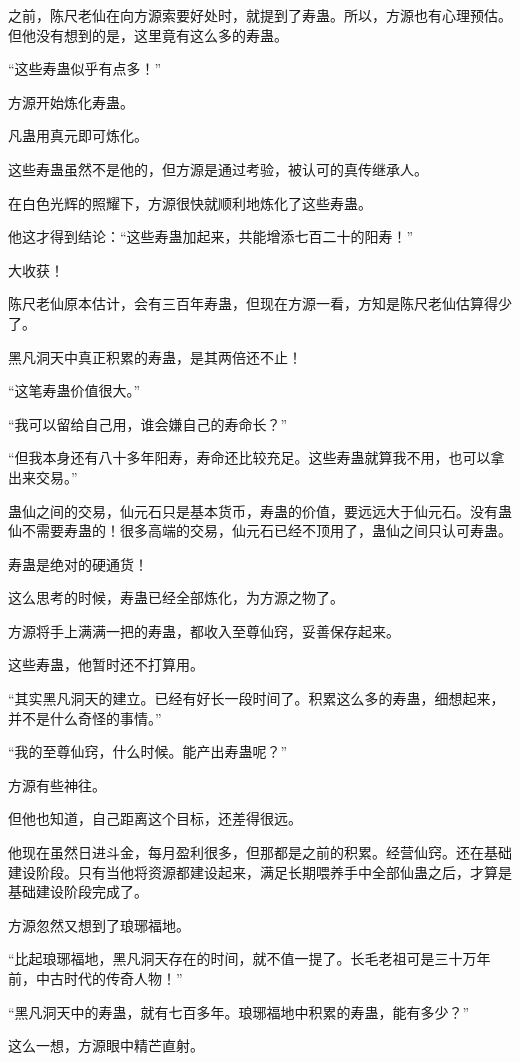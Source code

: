 \begin{this_body}
之前，陈尺老仙在向方源索要好处时，就提到了寿蛊。所以，方源也有心理预估。但他没有想到的是，这里竟有这么多的寿蛊。

“这些寿蛊似乎有点多！”

方源开始炼化寿蛊。

凡蛊用真元即可炼化。

这些寿蛊虽然不是他的，但方源是通过考验，被认可的真传继承人。

在白色光辉的照耀下，方源很快就顺利地炼化了这些寿蛊。

他这才得到结论：“这些寿蛊加起来，共能增添七百二十的阳寿！”

大收获！

陈尺老仙原本估计，会有三百年寿蛊，但现在方源一看，方知是陈尺老仙估算得少了。

黑凡洞天中真正积累的寿蛊，是其两倍还不止！

“这笔寿蛊价值很大。”

“我可以留给自己用，谁会嫌自己的寿命长？”

“但我本身还有八十多年阳寿，寿命还比较充足。这些寿蛊就算我不用，也可以拿出来交易。”

蛊仙之间的交易，仙元石只是基本货币，寿蛊的价值，要远远大于仙元石。没有蛊仙不需要寿蛊的！很多高端的交易，仙元石已经不顶用了，蛊仙之间只认可寿蛊。

寿蛊是绝对的硬通货！

这么思考的时候，寿蛊已经全部炼化，为方源之物了。

方源将手上满满一把的寿蛊，都收入至尊仙窍，妥善保存起来。

这些寿蛊，他暂时还不打算用。

“其实黑凡洞天的建立。已经有好长一段时间了。积累这么多的寿蛊，细想起来，并不是什么奇怪的事情。”

“我的至尊仙窍，什么时候。能产出寿蛊呢？”

方源有些神往。

但他也知道，自己距离这个目标，还差得很远。

他现在虽然日进斗金，每月盈利很多，但那都是之前的积累。经营仙窍。还在基础建设阶段。只有当他将资源都建设起来，满足长期喂养手中全部仙蛊之后，才算是基础建设阶段完成了。

方源忽然又想到了琅琊福地。

“比起琅琊福地，黑凡洞天存在的时间，就不值一提了。长毛老祖可是三十万年前，中古时代的传奇人物！”

“黑凡洞天中的寿蛊，就有七百多年。琅琊福地中积累的寿蛊，能有多少？”

这么一想，方源眼中精芒直射。


\end{this_body}
